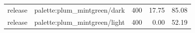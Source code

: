 \begin{longtable}{l>{\raggedright\arraybackslash}p{.42\linewidth}rrr}
release & %
palette:plum\_\allowbreak{}mintgreen/dark & %
400 & %
17.75 & %
85.08 \\ %

release & %
palette:plum\_\allowbreak{}mintgreen/light & %
400 & %
0.00 & %
52.19 \\ %


\end{longtable}

